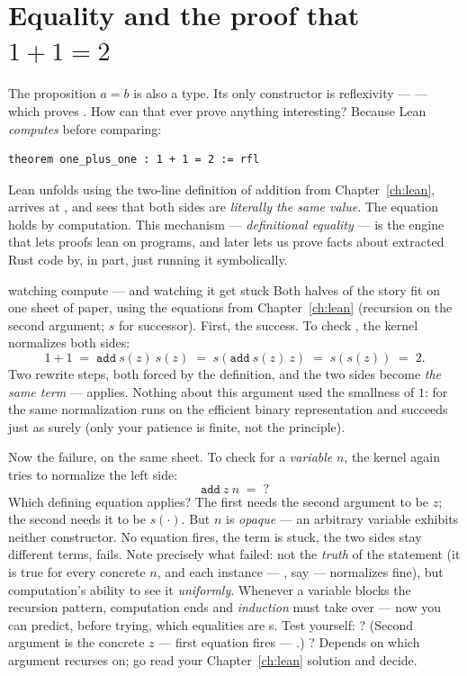\section{Equality and the proof that \texorpdfstring{$1+1=2$}{1+1=2}}

The proposition $a = b$ is also a type. Its only constructor is reflexivity
---  --- which proves . How can that ever prove
anything interesting? Because Lean \emph{computes} before comparing:

\begin{lstlisting}[language=Lean]
theorem one_plus_one : 1 + 1 = 2 := rfl
\end{lstlisting}

Lean unfolds  using the two-line definition of addition from
Chapter~\ref{ch:lean}, arrives at , and sees that both sides are
\emph{literally the same value}. The equation holds by computation. This
mechanism --- \emph{definitional equality} --- is the engine that lets proofs
lean on programs, and later lets us prove facts about extracted Rust code by,
in part, just running it symbolically.

\begin{worked}{watching  compute --- and watching it get stuck}
Both halves of the  story fit on one sheet of paper, using the
 equations from Chapter~\ref{ch:lean} (recursion on the second
argument; $s$ for successor). First, the success. To check
, the kernel normalizes both sides:
\[
1 + 1 \;=\; \mathtt{add}\ s(z)\ s(z)
\;=\; s(\mathtt{add}\ s(z)\ z)
\;=\; s(s(z))
\;=\; 2 .
\]
Two rewrite steps, both forced by the definition, and the two sides become
\emph{the same term} ---  applies. Nothing about this argument
used the smallness of $1$: for  the same normalization
runs on the efficient binary representation and succeeds just as surely
(only your patience is finite, not the principle).

Now the failure, on the same sheet. To check  for a
\emph{variable} $n$, the kernel again tries to normalize the left side:
\[
\mathtt{add}\ z\ n \;=\; ?
\]
Which defining equation applies? The first needs the second argument to be
$z$; the second needs it to be $s(\cdot)$. But $n$ is \emph{opaque} --- an
arbitrary variable exhibits neither constructor. No equation fires, the
term is stuck, the two sides stay different terms,  fails. Note
precisely what failed: not the \emph{truth} of the statement (it is true
for every concrete $n$, and each instance --- , say ---
normalizes fine), but computation's ability to see it \emph{uniformly}.
Whenever a variable blocks the recursion pattern, computation ends and
\emph{induction} must take over --- now you can predict, before trying,
which equalities are s. Test yourself: ?
(Second argument is the concrete $z$ --- first equation fires ---
.) ? Depends on which argument 
recurses on; go read your Chapter~\ref{ch:lean} solution and decide.
\end{worked}

